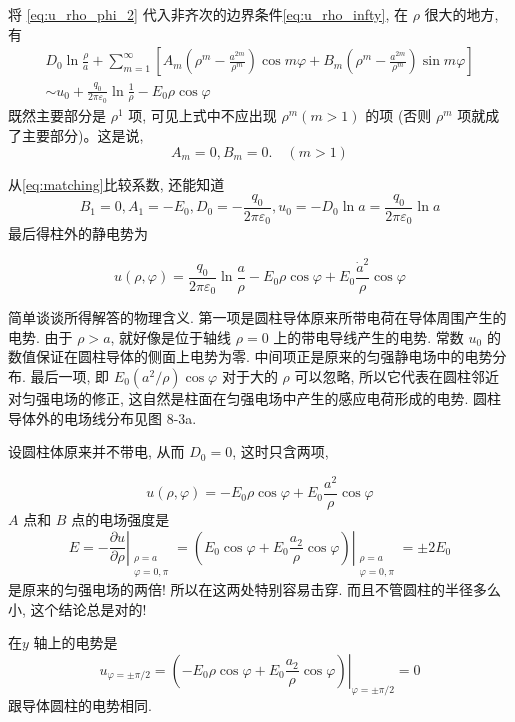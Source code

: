将 \eqref{eq:u_rho_phi_2} 代入非齐次的边界条件\eqref{eq:u_rho_infty}, 在 $\rho$ 很大的地方, 有
\begin{equation}
    \begin{gathered}
        D_{0} \ln \frac{\rho}{a}+\sum_{m=1}^{\infty}\left[A_{m}\left(\rho^{m}-\frac{a^{2 m}}{\rho^{m}}\right) \cos m \varphi+B_{m}\left(\rho^{m}-\frac{a^{2 m}}{\rho^{m}}\right) \sin m \varphi\right] \\
        \sim u_{0}+\frac{q_{0}}{2 \pi \varepsilon_{0}} \ln \frac{1}{\rho}-E_{0} \rho \cos \varphi
    \end{gathered}
    \label{eq:matching}
\end{equation}
既然主要部分是 $\rho^{1}$ 项, 可见上式中不应出现 $\rho^{m}(m>1)$ 的项 (否则 $\rho^{m}$ 项就成了主要部分)。这是说,
$$
A_{m}=0, B_{m}=0 . \quad(m>1)
$$

从\eqref{eq:matching}比较系数, 还能知道
$$
B_{1}=0, A_{1}=-E_{0}, D_{0}=-\frac{q_{0}}{2 \pi \varepsilon_{0}}, 
u_{0}=-D_{0} \ln a=\frac{q_{0}}{2 \pi \varepsilon_{0}} \ln a
$$
最后得柱外的静电势为

$$
u(\rho, \varphi)=\frac{q_{0}}{2 \pi \varepsilon_{0}} \ln \frac{a}{\rho}-E_{0} \rho \cos \varphi+E_{0} \frac{\dot{a}^{2}}{\rho} \cos \varphi
$$

简单谈谈所得解答的物理含义. 
第一项是圆柱导体原来所带电荷在导体周围产生的电势. 
由于 $\rho>a$, 就好像是位于轴线 $\rho=0$ 上的带电导线产生的电势. 
常数 $u_{0}$ 的数值保证在圆柱导体的侧面上电势为零. 中间项正是原来的匀强静电场中的电势分布. 
最后一项, 即 $E_{0}\left(a^{2} / \rho\right) \cos \varphi$ 对于大的 $\rho$ 可以忽略,
所以它代表在圆柱邻近对匀强电场的修正, 这自然是柱面在匀强电场中产生的感应电荷形成的电势. 圆柱导体外的电场线分布见图 8-3a.

设圆柱体原来并不带电, 从而 $D_{0}=0$, 这时只含两项,

$$
u(\rho, \varphi)=-E_{0} \rho \cos \varphi+E_{0} \frac{a^{2}}{\rho} \cos \varphi
$$
$A$ 点和 $B$ 点的电场强度是
$$
E=-\left.\frac{\partial u}{\partial \rho}\right|_{\substack{\rho=a \\ \varphi=0, \pi}}
=\left.\left(E_{0} \cos \varphi+E_{0} \frac{a_{2}}{\rho} \cos \varphi\right)\right|_{\substack{\rho=a \\ \varphi=0, \pi}}
= \pm 2 E_{0}
$$
是原来的匀强电场的两倍! 所以在这两处特别容易击穿. 而且不管圆柱的半径多么小, 这个结论总是对的!

在$y$ 轴上的电势是
$$
u_{\varphi= \pm \pi / 2}=\left.\left(-E_{0} \rho \cos \varphi+E_{0} \frac{a_{2}}{\rho} \cos \varphi\right)\right|_{\varphi= \pm \pi / 2}=0
$$
跟导体圆柱的电势相同. 
